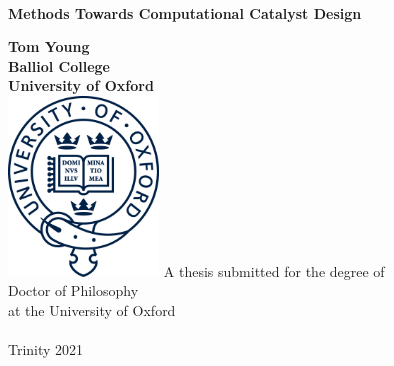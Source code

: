 \documentclass[main.tex]{subfiles}
\begin{document}
	
	
	\rhead[]{\nouppercase{\rightmark}}
	\lhead[\nouppercase{\leftmark}]{}
	\rfoot[]{\thepage}
	\cfoot{}
	\lfoot[\thepage]{}

	\setlength{\parindent}{15pt}

	
	\begin{titlepage}
		\begin{center}
			\begin{Large}
				\ \\
				\vspace{1.5cm}
				{\bfseries Methods Towards Computational Catalyst Design}\\\vspace{0.3cm}
			\end{Large}
			\vspace{2.5cm}
			{\bfseries Tom Young}\\
			\vspace{1cm}
			{\bfseries Balliol College}\\
			{\bfseries University of Oxford}\\
			\vspace{2.5cm}
			\includegraphics[width=4cm]{0/figs/logo.png}
			\vfill
			A thesis submitted for the degree of\\
			Doctor of Philosophy\\
			at the University of Oxford\\
			\ \\
			Trinity 2021
		\end{center}
	\end{titlepage}
	
	\newpage
	\thispagestyle{empty}
	\ \\
	\newpage
	
\end{document}
